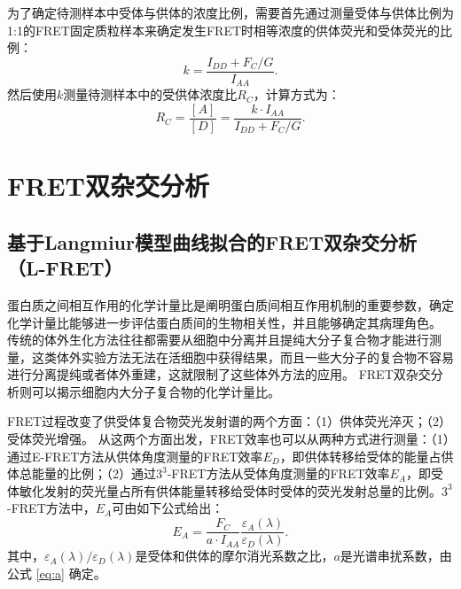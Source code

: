 为了确定待测样本中受体与供体的浓度比例，需要首先通过测量受体与供体比例为1:1的FRET固定质粒样本来确定发生FRET时相等浓度的供体荧光和受体荧光的比例：
\begin{equation}
    k=\frac{I_{DD}+F_C/G}{I_{AA}}.
    \label{eq:k}
\end{equation}
然后使用$k$测量待测样本中的受供体浓度比$R_C$，计算方式为：
\begin{equation}
    R_C = \frac{[A]}{[D]} = \frac{k \cdot I_{AA}}{I_{DD} + F_C/G}.
    \label{eq:rc}
\end{equation}
\fi

\section{FRET双杂交分析}

\subsection{基于Langmiur模型曲线拟合的FRET双杂交分析（L-FRET）}

\ifshowtext
蛋白质之间相互作用的化学计量比是阐明蛋白质间相互作用机制的重要参数，确定化学计量比能够进一步评估蛋白质间的生物相关性，并且能够确定其病理角色。
传统的体外生化方法往往都需要从细胞中分离并且提纯大分子复合物才能进行测量，这类体外实验方法无法在活细胞中获得结果，而且一些大分子的复合物不容易进行分离提纯或者体外重建，这就限制了这些体外方法的应用。
FRET双杂交分析则可以揭示细胞内大分子复合物的化学计量比。

FRET过程改变了供受体复合物荧光发射谱的两个方面：（1）供体荧光淬灭；（2）受体荧光增强。
从这两个方面出发，FRET效率也可以从两种方式进行测量：（1）通过E-FRET方法从供体角度测量的FRET效率$E_D$，即供体转移给受体的能量占供体总能量的比例；（2）通过$3^3$-FRET方法从受体角度测量的FRET效率$E_A$，即受体敏化发射的荧光量占所有供体能量转移给受体时受体的荧光发射总量的比例。$3^3$-FRET方法中，$E_A$可由如下公式给出：
\begin{equation}
    E_A = \frac{F_C}{a \cdot I_{AA}} \frac{\varepsilon_A(\lambda)}{\varepsilon_D(\lambda)}.
    \label{eq:ea}
\end{equation}
其中，$\varepsilon_A(\lambda) / \varepsilon_D(\lambda)$是受体和供体的摩尔消光系数之比，$a$是光谱串扰系数，由公式 \ref{eq:a} 确定。

